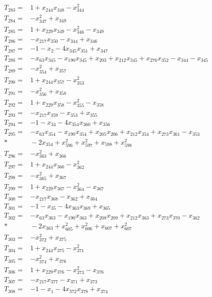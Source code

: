 \begin{align*}
T_{283}={}&1+x_{244}x_{348}-x_{344}^{2}\\[3pt]
T_{284}={}&-x_{347}^{2}+x_{349}\\[3pt]
T_{285}={}&1+x_{229}x_{349}-x_{346}^{2}-x_{349}\\[3pt]
T_{286}={}&-x_{217}x_{350}-x_{344}+x_{346}\\[3pt]
T_{287}={}&-1-x_{2}-4x_{345}x_{351}+x_{347}\\[3pt]
T_{288}={}&-x_{63}x_{345}-x_{190}x_{345}+x_{203}+x_{212}x_{345}+x_{276}x_{352}-x_{344}-x_{345}\\[3pt]
T_{289}={}&-x_{354}^{2}+x_{357}\\[3pt]
T_{290}={}&1+x_{244}x_{357}-x_{353}^{2}\\[3pt]
T_{291}={}&-x_{356}^{2}+x_{358}\\[3pt]
T_{292}={}&1+x_{229}x_{358}-x_{355}^{2}-x_{358}\\[3pt]
T_{293}={}&-x_{217}x_{359}-x_{353}+x_{355}\\[3pt]
T_{294}={}&-1-x_{34}-4x_{354}x_{360}+x_{356}\\[3pt]
T_{295}={}&-x_{63}x_{354}-x_{190}x_{354}+x_{205}x_{206}+x_{212}x_{354}+x_{273}x_{361}-x_{353}\\*
&{}-2x_{354}+x_{596}^{2}+x_{597}^{2}+x_{598}+x_{598}^{2}\\[3pt]
T_{296}={}&-x_{363}^{2}+x_{366}\\[3pt]
T_{297}={}&1+x_{244}x_{366}-x_{362}^{2}\\[3pt]
T_{298}={}&-x_{365}^{2}+x_{367}\\[3pt]
T_{299}={}&1+x_{229}x_{367}-x_{364}^{2}-x_{367}\\[3pt]
T_{300}={}&-x_{217}x_{368}-x_{362}+x_{364}\\[3pt]
T_{301}={}&-1-x_{35}-4x_{363}x_{369}+x_{365}\\[3pt]
T_{302}={}&-x_{63}x_{363}-x_{190}x_{363}+x_{208}x_{209}+x_{212}x_{363}+x_{273}x_{370}-x_{362}\\*
&{}-2x_{363}+x_{605}^{2}+x_{606}^{2}+x_{607}+x_{607}^{2}\\[3pt]
T_{303}={}&-x_{372}^{2}+x_{375}\\[3pt]
T_{304}={}&1+x_{244}x_{375}-x_{371}^{2}\\[3pt]
T_{305}={}&-x_{374}^{2}+x_{376}\\[3pt]
T_{306}={}&1+x_{229}x_{376}-x_{373}^{2}-x_{376}\\[3pt]
T_{307}={}&-x_{217}x_{377}-x_{371}+x_{373}\\[3pt]
T_{308}={}&-1-x_{1}-4x_{372}x_{378}+x_{374}\\[3pt]

\end{align*}
